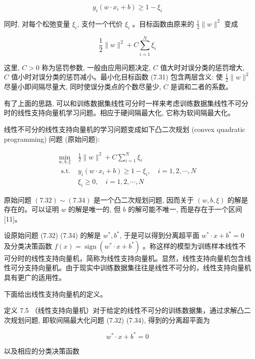 \documentclass[10pt]{article}
\begin{document}
$$
y_{i}\left(w \cdot x_{i}+b\right) \geqslant 1-\xi_{i}
$$

同时, 对每个松弛变量 $\xi_{i}$, 支付一个代价 $\xi_{i}$ 。目标函数由原来的 $\frac{1}{2}\|w\|^{2}$ 变成


\begin{equation*}
\frac{1}{2}\|w\|^{2}+C \sum_{i=1}^{N} \xi_{i} \tag{7.31}
\end{equation*}


这里, $C>0$ 称为惩罚参数, 一般由应用问题决定, $C$ 值大时对误分类的惩罚增大, $C$ 值小时对误分类的惩罚减小。最小化目标函数 (7.31) 包含两层含义: 使 $\frac{1}{2}\|w\|^{2}$ 尽量小即间隔尽量大, 同时使误分类点的个数尽量少, $C$ 是调和二者的系数。

有了上面的思路, 可以和训练数据集线性可分时一样来考虑训练数据集线性不可分时的线性支持向量机学习问题。相应于硬间隔最大化, 它称为软间隔最大化。

线性不可分的线性支持向量机的学习问题变成如下凸二次规划 (convex quadratic programming) 问题 (原始问题):

\[
\begin{array}{ll}
\min _{w, b, \xi} & \frac{1}{2}\|w\|^{2}+C \sum_{i=1}^{N} \xi_{i} \\
\text { s.t. } & y_{i}\left(w \cdot x_{i}+b\right) \geqslant 1-\xi_{i}, \quad i=1,2, \cdots, N \\
& \xi_{i} \geqslant 0, \quad i=1,2, \cdots, N \tag{7.34}
\end{array}
\]

原始问题 $(7.32) \sim(7.34)$ 是一个凸二次规划问题, 因而关于 $(w, b, \xi)$ 的解是存在的。可以证明 $w$ 的解是唯一的, 但 $b$ 的解可能不唯一, 而是存在于一个区间 [11]。

设原始问题 (7.32) (7.34) 的解是 $w^{*}, b^{*}$, 于是可以得到分离超平面 $w^{*} \cdot x+b^{*}=0$ 及分类决策函数 $f(x)=\operatorname{sign}\left(w^{*} \cdot x+b^{*}\right)$ 。称这样的模型为训练样本线性不可分时的线性支持向量机，简称为线性支持向量机。显然，线性支持向量机包含线性可分支持向量机。由于现实中训练数据集往往是线性不可分的，线性支持向量机具有更广的适用性。

下面给出线性支持向量机的定义。

定义 7.5 （线性支持向量机）对于给定的线性不可分的训练数据集，通过求解凸二次规划问题, 即软间隔最大化问题 (7.32) (7.34), 得到的分离超平面为


\begin{equation*}
w^{*} \cdot x+b^{*}=0 \tag{7.35}
\end{equation*}


以及相应的分类决策函数
\end{document}
